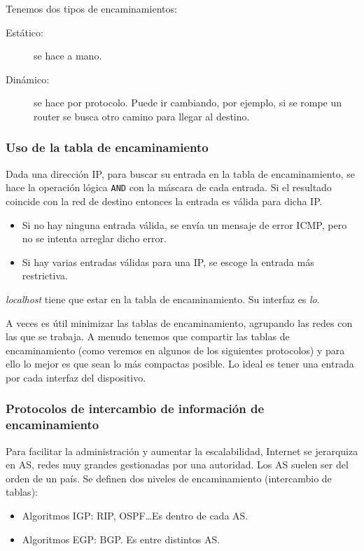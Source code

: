 \noindent
Tenemos dos tipos de encaminamientos:
\begin{description}
    \item [Estático:] se hace a mano.
    \item [Dinámico:] se hace por protocolo. Puede ir cambiando, por ejemplo, si se rompe un router se busca otro camino para llegar al destino.
\end{description}

\subsubsection{Uso de la tabla de encaminamiento}
Dada una dirección IP, para buscar su entrada en la tabla de encaminamiento, se hace la operación lógica \verb|AND| con la máscara de cada entrada. Si el resultado coincide con la red de destino entonces la entrada es válida para dicha IP\@.
\begin{itemize}
    \item Si no hay ninguna entrada válida, se envía un mensaje de error \acrshort{ICMP}\@, pero no se intenta arreglar dicho error.
    \item Si hay varias entradas válidas para una IP\@, se escoge la entrada más restrictiva. 

\end{itemize}

\begin{observacion}
    \textit{localhost} tiene que estar en la tabla de encaminamiento. Su interfaz es \textit{lo}.
\end{observacion}

A veces es útil minimizar las tablas de encaminamiento, agrupando las redes con las que se trabaja. A menudo tenemos que compartir las tablas de encaminamiento (como veremos en algunos de los siguientes protocolos) y para ello lo mejor es que sean lo más compactas posible. Lo ideal es tener una entrada por cada interfaz del dispositivo. 

\subsubsection{Protocolos de intercambio de información de encaminamiento}

Para facilitar la administración y aumentar la escalabilidad, Internet se jerarquiza en \acrfull{AS}, redes muy grandes gestionadas por una autoridad. Los \acrshort{AS} suelen ser del orden de un país. Se definen dos niveles de encaminamiento (intercambio de tablas):
\begin{itemize}
    \item Algoritmos \acrfull{IGP}: \acrshort{RIP}, \acrshort{OSPF}\ldots Es dentro de cada \acrshort{AS}.
    \item Algoritmos \acrfull{EGP}: \acrshort{BGP}. Es entre distintos \acrshort{AS}.
\end{itemize}

